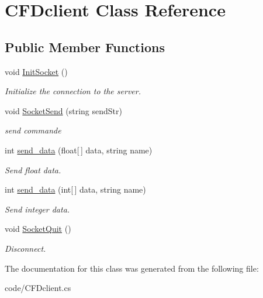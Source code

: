 \hypertarget{class_c_f_dclient}{}\section{C\+F\+Dclient Class Reference}
\label{class_c_f_dclient}
\subsection*{Public Member Functions}
\begin{DoxyCompactItemize}
\item 
\mbox{\label{class_c_f_dclient_a174e1d57b8bb8aedb83fc4834f1e1659}} 
void \mbox{\hyperlink{class_c_f_dclient_a174e1d57b8bb8aedb83fc4834f1e1659}{Init\+Socket}} ()
\begin{DoxyCompactList}\small\item\em Initialize the connection to the server. \end{DoxyCompactList}\item 
\mbox{\label{class_c_f_dclient_a0f583d17d97b65fbe8c04f48ddec9c66}} 
void \mbox{\hyperlink{class_c_f_dclient_a0f583d17d97b65fbe8c04f48ddec9c66}{Socket\+Send}} (string send\+Str)
\begin{DoxyCompactList}\small\item\em send commande \end{DoxyCompactList}\item 
\mbox{\label{class_c_f_dclient_a2537be0644272828674b34cf7dbbbc4a}} 
int \mbox{\hyperlink{class_c_f_dclient_a2537be0644272828674b34cf7dbbbc4a}{send\+\_\+data}} (float\mbox{[}$\,$\mbox{]} data, string name)
\begin{DoxyCompactList}\small\item\em Send float data. \end{DoxyCompactList}\item 
\mbox{\label{class_c_f_dclient_a606c822f55606176a5b8bbc567ce6535}} 
int \mbox{\hyperlink{class_c_f_dclient_a606c822f55606176a5b8bbc567ce6535}{send\+\_\+data}} (int\mbox{[}$\,$\mbox{]} data, string name)
\begin{DoxyCompactList}\small\item\em Send integer data. \end{DoxyCompactList}\item 
\mbox{\label{class_c_f_dclient_afd8e7239755d46202779bd51bf4ac125}} 
void \mbox{\hyperlink{class_c_f_dclient_afd8e7239755d46202779bd51bf4ac125}{Socket\+Quit}} ()
\begin{DoxyCompactList}\small\item\em Disconnect. \end{DoxyCompactList}\end{DoxyCompactItemize}


The documentation for this class was generated from the following file\+:\begin{DoxyCompactItemize}
\item 
code/C\+F\+Dclient.\+cs\end{DoxyCompactItemize}
